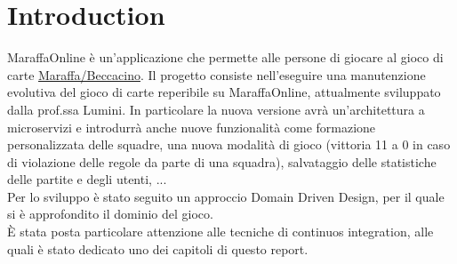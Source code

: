 \chapter{Introduction}
\label{ch:into} %
MaraffaOnline è un'applicazione che permette alle persone di giocare al gioco di carte \href{https://it.wikipedia.org/wiki/Marafone_Beccacino}{Maraffa/Beccacino}. 
Il progetto consiste nell’eseguire una manutenzione evolutiva del gioco di carte reperibile su MaraffaOnline, attualmente sviluppato dalla prof.ssa Lumini.
In particolare la nuova versione avrà un'architettura a microservizi e introdurrà anche nuove funzionalità come formazione personalizzata delle squadre, una nuova modalità 
di gioco (vittoria 11 a 0 in caso di violazione delle regole da parte di una squadra), salvataggio delle statistiche delle partite e degli utenti, ...
\\
Per lo sviluppo è stato seguito un approccio Domain Driven Design, per il quale si è approfondito il dominio del gioco.
\\
È stata posta particolare attenzione alle tecniche di continuos integration, alle quali è stato dedicato uno dei capitoli di questo report.
